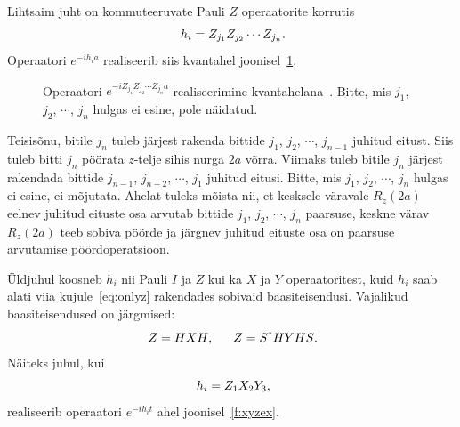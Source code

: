 \documentclass[12pt]{report}
\begin{document}
Lihtsaim juht on kommuteeruvate Pauli \(Z\) operaatorite korrutis
\begin{equation}\label{eq:onlyz}
  h_i = Z_{j_1}Z_{j_2}\cdots Z_{j_n} \rlap{.}
\end{equation}
Operaatori \(e^{-i h_i a}\) realiseerib siis kvantahel joonisel~\ref{f:expz}.
\begin{figure}[h]
  \centering
  \ifdefined\yquanton
  \fi
  \caption{Operaatori \(e^{-iZ_{j_1}Z_{j_2}\cdots Z_{j_n}a}\) realiseerimine kvantahelana~\cite{mansky+etal, nielsen+chuang}. Bitte, mis \(j_1\), \(j_2\), \(\cdots\), \(j_n\) hulgas ei esine, pole näidatud.}
  \label{f:expz}
\end{figure}
Teisisõnu, bitile \(j_n\) tuleb järjest rakenda bittide \(j_1\), \(j_2\), \(\cdots\), \(j_{n-1}\) juhitud eitust.
Siis tuleb bitti \(j_n\) pöörata \(z\)-telje sihis nurga \(2a\) võrra.
Viimaks tuleb bitile \(j_n\) järjest rakendada bittide \(j_{n-1}\), \(j_{n-2}\), \(\cdots\), \(j_1\) juhitud eitusi.
Bitte, mis \(j_1\), \(j_2\), \(\cdots\), \(j_n\) hulgas ei esine, ei mõjutata.
Ahelat tuleks mõista nii, et kesksele väravale \(R_z(2a)\) eelnev juhitud eituste osa arvutab bittide \(j_1\), \(j_2\), \(\cdots\), \(j_n\) paarsuse, keskne värav \(R_z(2a)\) teeb sobiva pöörde ja järgnev juhitud eituste osa on paarsuse arvutamise pöördoperatsioon.

Üldjuhul koosneb \(h_i\) nii Pauli \(I\) ja \(Z\) kui ka \(X\) ja \(Y\) operaatoritest, kuid \(h_i\) saab alati viia kujule~\eqref{eq:onlyz} rakendades sobivaid baasiteisendusi.
Vajalikud baasiteisendused on järgmised:
\begin{align}
    Z = HXH \rlap{,}\qquad Z = S^\dagger HYHS \rlap{.}
\end{align}
Näiteks juhul, kui
\begin{equation}
  h_i = Z_1X_2Y_3 \rlap{,}
\end{equation}
realiseerib operaatori \(e^{-i h_i t}\) ahel joonisel~\ref{f:xyzex}.
\end{document}
